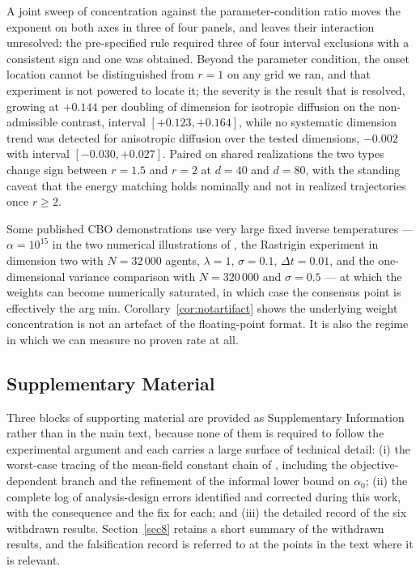 \documentclass[pdflatex,sn-mathphys-num]{sn-jnl}
\theoremstyle{thmstyleone}
\theoremstyle{thmstyletwo}
\theoremstyle{thmstylethree}
\begin{document}
A joint sweep of concentration against the parameter-condition ratio moves the exponent on both axes in three of four panels, and leaves their interaction unresolved: the pre-specified rule required three of four interval exclusions with a consistent sign and one was obtained. Beyond the parameter condition, the onset location cannot be distinguished from $r=1$ on any grid we ran, and that experiment is not powered to locate it; the severity is the result that is resolved, growing at $+0.144$ per doubling of dimension for isotropic diffusion on the non-admissible contrast, interval $[+0.123,+0.164]$, while no systematic dimension trend was detected for anisotropic diffusion over the tested dimensions, $-0.002$ with interval $[-0.030,+0.027]$. Paired on shared realizations the two types change sign between $r=1.5$ and $r=2$ at $d=40$ and $d=80$, with the standing caveat that the energy matching holds nominally and not in realized trajectories once $r\ge2$.

Some published CBO demonstrations use very large fixed inverse temperatures --- $\alpha=10^{15}$ in the two numerical illustrations of \cite{fkr2024}, the Rastrigin experiment in dimension two with $N=32\,000$ agents, $\lambda=1$, $\sigma=0.1$, $\Delta t=0.01$, and the one-dimensional variance comparison with $N=320\,000$ and $\sigma=0.5$ --- at which the weights can become numerically saturated, in which case the consensus point is effectively the arg min. Corollary~\ref{cor:notartifact} shows the underlying weight concentration is not an artefact of the floating-point format. It is also the regime in which we can measure no proven rate at all.

\backmatter

\begin{appendices}
\section{Supplementary Material}\label{appA}
Three blocks of supporting material are provided as Supplementary Information rather than in the main text, because none of them is required to follow the experimental argument and each carries a large surface of technical detail: (i) the worst-case tracing of the mean-field constant chain of \cite{fkr2024}, including the objective-dependent branch and the refinement of the informal lower bound on $\alpha_0$; (ii) the complete log of analysis-design errors identified and corrected during this work, with the consequence and the fix for each; and (iii) the detailed record of the six withdrawn results. Section~\ref{sec8} retains a short summary of the withdrawn results, and the falsification record is referred to at the points in the text where it is relevant.
\end{appendices}
\end{document}
